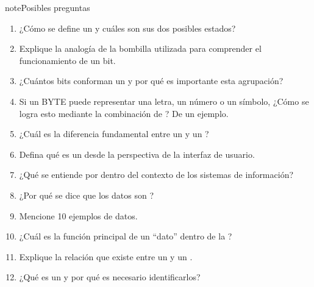\documentclass[letterpaper,10pt,spanish]{sphinxmanual}
\begin{document}
\begin{sphinxadmonition}{note}{Posibles preguntas}
\begin{enumerate}
%
\item {} 
\sphinxAtStartPar
¿Cómo se define un  y cuáles son sus dos posibles estados?

\item {} 
\sphinxAtStartPar
Explique la analogía de la bombilla utilizada para comprender el funcionamiento de un bit.

\item {} 
\sphinxAtStartPar
¿Cuántos bits conforman un  y por qué es importante esta agrupación?

\item {} 
\sphinxAtStartPar
Si un BYTE puede representar una letra, un número o un símbolo, ¿Cómo se logra esto mediante la combinación de ? De un ejemplo.

\item {} 
\sphinxAtStartPar
¿Cuál es la diferencia fundamental entre un  y un ?

\item {} 
\sphinxAtStartPar
Defina qué es un  desde la perspectiva de la interfaz de usuario.

\item {} 
\sphinxAtStartPar
¿Qué se entiende por  dentro del contexto de los sistemas de información?

\item {} 
\sphinxAtStartPar
¿Por qué se dice que los datos son ?

\item {} 
\sphinxAtStartPar
Mencione 10 ejemplos de datos.

\item {} 
\sphinxAtStartPar
¿Cuál es la función principal de un “dato” dentro de la ?

\item {} 
\sphinxAtStartPar
Explique la relación que existe entre un  y un .

\item {} 
\sphinxAtStartPar
¿Qué es un  y por qué es necesario identificarlos?


\end{enumerate}
\end{sphinxadmonition}
\end{document}
